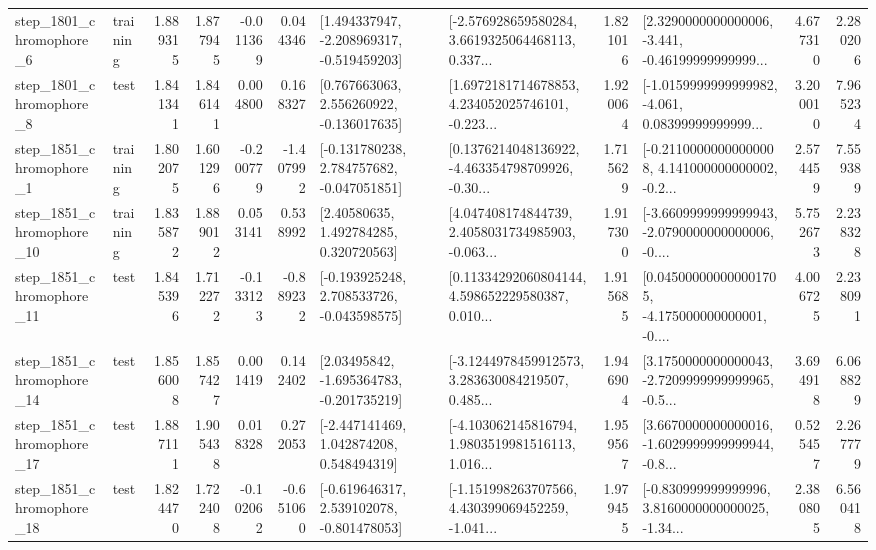 \begin{tabular}{llrrrrllrlrr}
  step\_1801\_chromophore\_6 &  training &      1.889315 &    1.877945 &     -0.011369 &  0.044346 &   [1.494337947, -2.208969317, -0.519459203] &  [-2.576928659580284, 3.6619325064468113, 0.337... &       1.821016 &  [2.3290000000000006, -3.441, -0.46199999999999... &            4.677310 &          2.280206 \\
  step\_1801\_chromophore\_8 &      test &      1.841341 &    1.846141 &      0.004800 &  0.168327 &    [0.767663063, 2.556260922, -0.136017635] &  [1.6972181714678853, 4.234052025746101, -0.223... &       1.920064 &  [-1.0159999999999982, -4.061, 0.08399999999999... &            3.200010 &          7.965234 \\
  step\_1851\_chromophore\_1 &  training &      1.802075 &    1.601296 &     -0.200779 & -1.407992 &   [-0.131780238, 2.784757682, -0.047051851] &  [0.1376214048136922, -4.463354798709926, -0.30... &       1.715629 &  [-0.21100000000000008, 4.141000000000002, -0.2... &            2.574459 &          7.559389 \\
 step\_1851\_chromophore\_10 &  training &      1.835872 &    1.889012 &      0.053141 &  0.538992 &      [2.40580635, 1.492784285, 0.320720563] &  [4.047408174844739, 2.4058031734985903, -0.063... &       1.917300 &  [-3.6609999999999943, -2.0790000000000006, -0.... &            5.752673 &          2.238328 \\
 step\_1851\_chromophore\_11 &      test &      1.845396 &    1.712272 &     -0.133123 & -0.889232 &   [-0.193925248, 2.708533726, -0.043598575] &  [0.11334292060804144, 4.598652229580387, 0.010... &       1.915685 &  [0.045000000000001705, -4.175000000000001, -0.... &            4.006725 &          2.238091 \\
 step\_1851\_chromophore\_14 &      test &      1.856008 &    1.857427 &      0.001419 &  0.142402 &    [2.03495842, -1.695364783, -0.201735219] &  [-3.1244978459912573, 3.283630084219507, 0.485... &       1.946904 &  [3.1750000000000043, -2.7209999999999965, -0.5... &            3.694918 &          6.068829 \\
 step\_1851\_chromophore\_17 &      test &      1.887111 &    1.905438 &      0.018328 &  0.272053 &    [-2.447141469, 1.042874208, 0.548494319] &  [-4.103062145816794, 1.9803519981516113, 1.016... &       1.959567 &  [3.6670000000000016, -1.6029999999999944, -0.8... &            0.525457 &          2.267779 \\
 step\_1851\_chromophore\_18 &      test &      1.824470 &    1.722408 &     -0.102062 & -0.651060 &   [-0.619646317, 2.539102078, -0.801478053] &  [-1.151998263707566, 4.430399069452259, -1.041... &       1.979455 &  [-0.830999999999996, 3.8160000000000025, -1.34... &            2.380805 &          6.560418 \\

\end{tabular}
